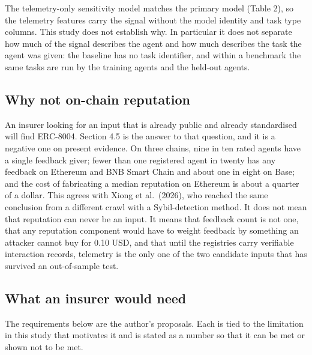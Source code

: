 \documentclass[
  11pt,
  a4paper,
]{article}
\begin{document}
The telemetry-only sensitivity model matches the primary model (Table
2), so the telemetry features carry the signal without the model
identity and task type columns. This study does not establish why. In
particular it does not separate how much of the signal describes the
agent and how much describes the task the agent was given: the baseline
has no task identifier, and within a benchmark the same tasks are run by
the training agents and the held-out agents.

\hypertarget{why-not-on-chain-reputation}{%
\subsection{Why not on-chain
reputation}\label{why-not-on-chain-reputation}}

An insurer looking for an input that is already public and already
standardised will find ERC-8004. Section 4.5 is the answer to that
question, and it is a negative one on present evidence. On three chains,
nine in ten rated agents have a single feedback giver; fewer than one
registered agent in twenty has any feedback on Ethereum and BNB Smart
Chain and about one in eight on Base; and the cost of fabricating a
median reputation on Ethereum is about a quarter of a dollar. This
agrees with Xiong et al.~(2026), who reached the same conclusion from a
different crawl with a Sybil-detection method. It does not mean that
reputation can never be an input. It means that feedback count is not
one, that any reputation component would have to weight feedback by
something an attacker cannot buy for 0.10 USD, and that until the
registries carry verifiable interaction records, telemetry is the only
one of the two candidate inputs that has survived an out-of-sample test.

\hypertarget{what-an-insurer-would-need}{%
\subsection{What an insurer would
need}\label{what-an-insurer-would-need}}

The requirements below are the author's proposals. Each is tied to the
limitation in this study that motivates it and is stated as a number so
that it can be met or shown not to be met.
\end{document}
